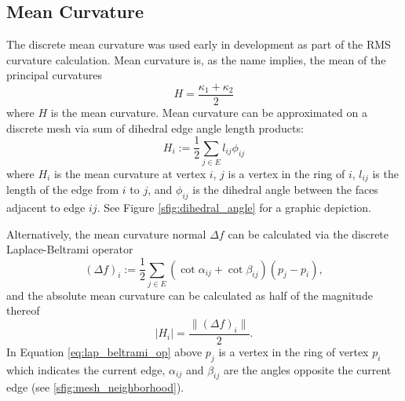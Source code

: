 \subsection{Mean Curvature}\label{sec:mean_k}
The discrete mean curvature was used early in development as part of the RMS curvature calculation.
Mean curvature is, as the name implies, the mean of the principal curvatures~\cite{DDGAppIntro_19_discrete_k_2}
\begin{equation}\label{eq:mean_k}
	H = \frac{\kappa_1 + \kappa_2}{2}
\end{equation}
where $H$ is the mean curvature.
Mean curvature can be approximated on a discrete mesh via sum of dihedral edge angle length products:
\begin{equation}\label{eq:dihedral_angle}
	H_i := \frac{1}{2}\sum_{j \in E}l_{ij} \phi_{ij}
\end{equation}
where $H_i$ is the mean curvature at vertex $i$, $j$ is a vertex in the ring of $i$, $l_{ij}$ is the length of the edge from $i$ to $j$, and $\phi_{ij}$ is the dihedral angle between the faces adjacent to edge $ij$.
See Figure \ref{sfig:dihedral_angle} for a graphic depiction.

Alternatively, the mean curvature normal $\Delta f$ can be calculated via the discrete Laplace-Beltrami operator~\cite{DDGAppIntro_18_discrete_k_1}
\begin{equation}\label{eq:lap_beltrami_op}
	(\Delta f)_i := \frac{1}{2}\sum_{j \in E}(\cot \alpha_{ij} + \cot \beta_{ij})(p_j - p_i),
\end{equation}
and the absolute mean curvature can be calculated as half of the magnitude thereof
\begin{equation}
	|H_i| = \frac{\|(\Delta f)_i \|}{2}.
\end{equation}
In Equation \ref{eq:lap_beltrami_op} above $p_j$ is a vertex in the ring of vertex $p_i$ which indicates the current edge, $\alpha_{ij}$ and $\beta_{ij}$ are the angles opposite the current edge (see \ref{sfig:mesh_neighborhood}).

